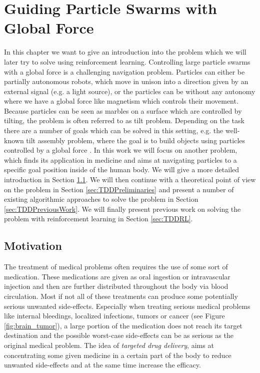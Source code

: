 \chapter{Guiding Particle Swarms with Global Force} \label{chp:TDD}
In this chapter we want to give an introduction into the problem which we will later try to solve using reinforcement learning. Controlling large particle swarms with a global force is a challenging navigation problem. Particles can either be partially autonomous robots, which move in unison into a direction given by an external signal (e.g. a light source), or the particles can be without any autonomy where we have a global force like magnetism which controls their movement. Because particles can be seen as marbles on a surface which are controlled by tilting, the problem is often referred to as tilt problem. Depending on the task there are a number of goals which can be solved in this setting, e.g. the well-known tilt assembly problem, where the goal is to build objects using particles controlled by a global force \cite{becker2018tilt}. In this work we will focus on another problem, which finds its application in medicine and aims at navigating particles to a specific goal position inside of the human body. We will give a more detailed introduction in Section \ref{sec:TDDMotivation}. We will then continue with a theoretical point of view on the problem in Section \ref{sec:TDDPreliminaries} and present a number of existing algorithmic approaches to solve the problem in Section \ref{sec:TDDPreviousWork}. We will finally present previous work on solving the problem with reinforcement learning in Section \ref{sec:TDDRL}. 

\section{Motivation} \label{sec:TDDMotivation}
The treatment of medical problems often requires the use of some sort of medication. These medications are given as oral ingestion or intravascular  injection and then are further distributed throughout the body via blood circulation. Most if not all of these treatments can produce some potentially serious unwanted side-effects. Especially when treating serious medical problems like internal bleedings, localized infections, tumors or cancer (see Figure \ref{fig:brain_tumor}), a large portion of the medication does not reach its target destination and the possible worst-case side-effects can be as serious as the original medical problem. The idea of \textit{targeted drug delivery}, aims at concentrating some given medicine in a certain part of the body to reduce unwanted side-effects and at the same time increase the efficacy.

